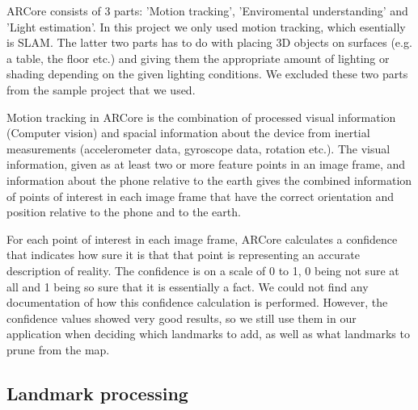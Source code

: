 \documentclass{article}
\begin{document}


ARCore consists of 3 parts: 'Motion tracking', 'Enviromental understanding' and 'Light estimation'. In this project we only used motion tracking, which esentially is SLAM. The latter two parts has to do with placing 3D objects on surfaces (e.g. a table, the floor etc.) and giving them the appropriate amount of lighting or shading depending on the given lighting conditions. We excluded these two parts from the sample project that we used. \cite{ARCore}

Motion tracking in ARCore is the combination of processed visual information (Computer vision) and spacial information about the device from inertial measurements (accelerometer data, gyroscope data, rotation etc.). The visual information, given as at least two or more feature points in an image frame, and information about the phone relative to the earth gives the combined information of points of interest in each image frame that have the correct orientation and position relative to the phone and to the earth. \cite{ARCore}

For each point of interest in each image frame, ARCore calculates a confidence that indicates how sure it is that that point is representing an accurate description of reality. The confidence is on a scale of 0 to 1, 0 being not sure at all and 1 being so sure that it is essentially a fact. We could not find any documentation of how this confidence calculation is performed. However, the confidence values showed very good results, so we still use them in our application when deciding which landmarks to add, as well as what landmarks to prune from the map.

\subsection{Landmark processing} \label{landmark-processing}
\end{document}
